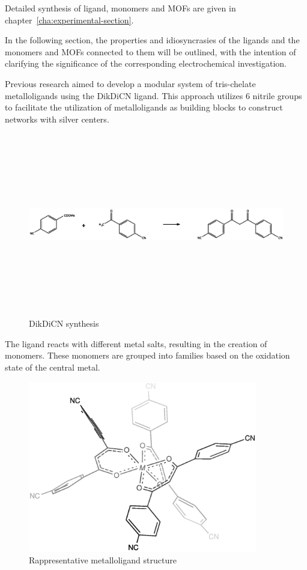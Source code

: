 \documentclass[../Master.tex]{subfiles}
\begin{document}
Detailed synthesis of ligand, monomers and MOFs are given in chapter\ \ref{cha:experimental-section}.

In the following section, the properties and idiosyncrasies of the ligands and the monomers and MOFs connected to them will be outlined, with the intention of clarifying the significance of the corresponding electrochemical investigation.

Previous research aimed to develop a modular system of tris-chelate metalloligands using the DikDiCN ligand.
This approach utilizes 6 nitrile groups to facilitate the utilization of metalloligands as building blocks to construct networks with silver centers.

\begin{figure}[h!]
	\centering
	\includegraphics[width=16cm,height=8cm,keepaspectratio]{Structures/dicn-sint.eps}\caption{DikDiCN synthesis}
\end{figure}

The ligand reacts with different metal salts, resulting in the creation of monomers. These monomers are grouped into families based on the oxidation state of the central metal.

\begin{figure}[h!]
	\centering
	\includegraphics[width=10cm,keepaspectratio]{Structures/monomero.eps}\caption{Rappresentative metalloligand structure}
\end{figure}
\newpage
\end{document}
